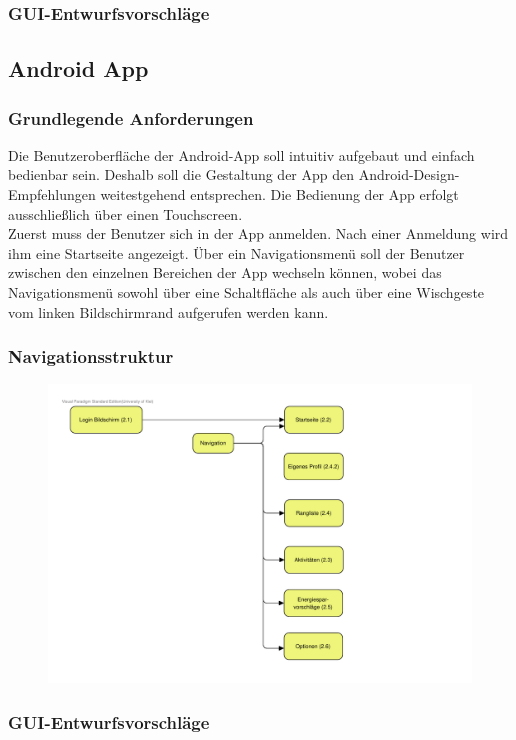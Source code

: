 \documentclass[10pt,a4paper]{article}
\begin{document}
\subsubsection{GUI-Entwurfsvorschläge}
\subsection{Android App}
\subsubsection{Grundlegende Anforderungen}
Die Benutzeroberfläche der Android-App soll intuitiv aufgebaut und einfach bedienbar sein. Deshalb
soll die Gestaltung der App den Android-Design-Empfehlungen weitestgehend entsprechen. Die Bedienung
der App erfolgt ausschließlich über einen Touchscreen. \\
Zuerst muss der Benutzer sich in der App anmelden. Nach einer Anmeldung wird ihm eine Startseite angezeigt. Über ein Navigationsmenü soll der Benutzer zwischen den einzelnen Bereichen der App wechseln können, wobei das Navigationsmenü sowohl über eine Schaltfläche als auch über eine Wischgeste vom linken Bildschirmrand aufgerufen werden kann.
\subsubsection{Navigationsstruktur}
\begin{figure}[h!]
	\includegraphics[width=\linewidth]{gfx/guinavigation/GUI-Navigation-App.pdf}
\end{figure}
\subsubsection{GUI-Entwurfsvorschläge}

\end{document}
